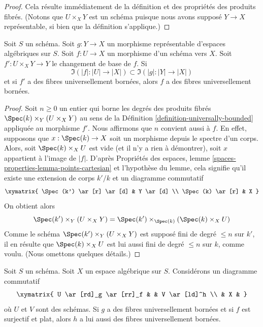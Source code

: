 \begin{proof}
Cela résulte immédiatement de la définition et des propriétés des produits
fibrés. (Notons que $U \times_X Y$ est un schéma puisque nous avons supposé
$Y \to X$ représentable, si bien que la définition s'applique.)
\end{proof}

\begin{lemma}
\label{lemma-descent-universally-bounded}
Soit $S$ un schéma. Soit $g : Y \to X$ un morphisme représentable d'espaces
algébriques sur $S$. Soit $f : U \to X$ un morphisme d'un schéma vers $X$.
Soit $f' : U \times_X Y \to Y$ le changement de base de $f$.
Si
$$
\Im(|f| : |U| \to |X|) \subset \Im(|g| : |Y| \to |X|)
$$
et si $f'$ a des fibres universellement bornées, alors $f$ a des fibres
universellement bornées.
\end{lemma}

\begin{proof}
Soit $n \geq 0$ un entier qui borne les degrés des produits fibrés
$\Spec(k) \times_Y (U \times_X Y)$ au sens de la
Définition \ref{definition-universally-bounded} appliquée au morphisme $f'$.
Nous affirmons que $n$ convient aussi à $f$. En effet, supposons que
$x : \Spec(k) \to X$ soit un morphisme depuis le spectre d'un corps.
Alors, soit $\Spec(k) \times_X U$ est vide (et il n'y a rien à démontrer),
soit $x$ appartient à l'image de $|f|$. D'après
Propriétés des espaces,
lemme \ref{spaces-properties-lemma-points-cartesian}
et l'hypothèse du lemme, cela signifie qu'il existe une extension de corps
$k'/k$ et un diagramme commutatif
$$
\xymatrix{
\Spec(k') \ar[r] \ar[d] & Y \ar[d] \\
\Spec(k) \ar[r] & X
}
$$
On obtient alors
$$
\Spec(k') \times_Y (U \times_X Y) =
\Spec(k') \times_{\Spec(k)} (\Spec(k) \times_X U)
$$
Comme le schéma $\Spec(k') \times_Y (U \times_X Y)$ est supposé fini de degré
$\leq n$ sur $k'$, il en résulte que $\Spec(k) \times_X U$ est lui aussi fini
de degré $\leq n$ sur $k$, comme voulu. (Nous omettons quelques détails.)
\end{proof}

\begin{lemma}
\label{lemma-universally-bounded-permanence}
Soit $S$ un schéma. Soit $X$ un espace algébrique sur $S$.
Considérons un diagramme commutatif
$$
\xymatrix{
U \ar[rd]_g \ar[rr]_f & & V \ar[ld]^h \\
& X &
}
$$
où $U$ et $V$ sont des schémas. Si $g$ a des fibres universellement bornées
et si $f$ est surjectif et plat, alors $h$ a lui aussi des fibres
universellement bornées.
\end{lemma}

